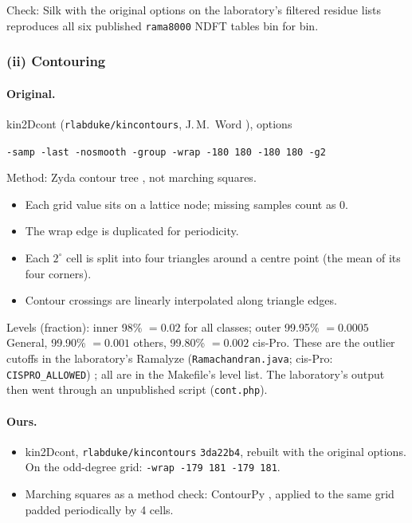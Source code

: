 \documentclass[11pt]{article}
\newcommand{\file}[1]{\texttt{#1}}
\begin{document}
Check: Silk with the original options on the laboratory's filtered residue lists reproduces all six
published \file{rama8000} NDFT tables bin for bin.

\subsubsection*{(ii) Contouring}

\paragraph{Original.} kin2Dcont (\file{rlabduke/kincontours}, J.\,M.~Word \cite{kincontours}),
options
\begin{center}\file{-samp -last -nosmooth -group -wrap -180 180 -180 180 -g2}\end{center}
Method: Zyda contour tree
\cite{Zyda1988}, not marching squares.
\begin{itemize}
  \item Each grid value sits on a lattice node; missing samples count as 0.
  \item The wrap edge is duplicated for periodicity.
  \item Each $2^\circ$ cell is split into four triangles around a centre point (the mean of its
    four corners).
  \item Contour crossings are linearly interpolated along triangle edges.
\end{itemize}
Levels (fraction): inner 98\% $=0.02$ for all classes; outer 99.95\% $=0.0005$ General,
99.90\% $=0.001$ others, 99.80\% $=0.002$ cis-Pro. These are the outlier cutoffs in the
laboratory's Ramalyze (\file{Ramachandran.java}; cis-Pro: \file{CISPRO\_ALLOWED}) \cite{javadev};
all are in the Makefile's level list. The laboratory's output then went through an unpublished script (\file{cont.php}).

\paragraph{Ours.}
\begin{itemize}
  \item kin2Dcont, \file{rlabduke/kincontours} \file{3da22b4}, rebuilt with the original options.
    On the odd-degree grid: \file{-wrap -179 181 -179 181}.
  \item Marching squares as a method check: ContourPy \cite{contourpy}, applied to the same grid
    padded periodically by 4 cells.
\end{itemize}
\end{document}
